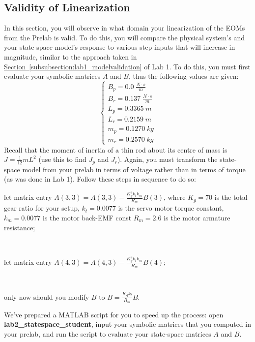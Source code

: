 \documentclass[12pt]{report}
\newcommand{\indentitem}{\setlength\itemindent{25pt}}
\begin{document}
\subsection{Validity of Linearization}\label{lab2:linearization_validity}
In this section, you will observe in what domain your linearization of the EOMs from the Prelab is valid. To do this, you will compare the physical system's and your state-space model's response to various step inputs that will increase in magnitude, similar to the approach taken in \hyperref[subsubsection:lab1_modelvalidation]{Section~\ref{subsubsection:lab1_modelvalidation}} of Lab 1. To do this, you must first evaluate your symbolic matrices $A$ and $B$, thus the following values are given:
\[
    \begin{cases}
        B_p = 0.0 \; \frac{N\cdot s}{m}   \\
        B_r = 0.137 \; \frac{N\cdot s}{m} \\
        L_p = 0.3365 \; m                 \\
        L_r = 0.2159 \; m                 \\
        m_p = 0.1270 \; kg                \\
        m_r = 0.2570 \; kg
    \end{cases}
\]
Recall that the moment of inertia of a thin rod about its centre of mass is $J = \frac{1}{12} m L^2$ (use this to find $J_p$ and $J_r$). Again, you must transform the state-space model from your prelab in terms of voltage rather than in terms of torque (as was done in Lab 1). Follow these steps in sequence to do so:
\begin{enumerate}
    {\indentitem \item[Step 1:] let matrix entry $A(3,3) = A(3,3) - \frac{K_{g}^2 k_t k_m}{R_m} B(3)$, where $K_g=70$ is the total gear ratio for your setup, $k_t=0.0077$ is the servo motor torque constant, $k_m = 0.0077$ is the motor back-EMF const   $R_m=2.6$ is the motor armature resistance;} \\
          {\indentitem \item[Step 2:] let matrix entry $A(4,3) = A(4,3) - \frac{K_{g}^2 k_t k_m}{R_m} B(4)$;} \\
          {\indentitem \item[Step 3:] only now should you modify $B$ to $B = \frac{K_g k_t}{R_m} B$.}
\end{enumerate}
We've prepared a MATLAB script for you to speed up the process: open \textbf{lab2\_statespace\_student}, input your symbolic matrices that you computed in your prelab, and run the script to evaluate your state-space matrices $A$ and $B$.
\end{document}
